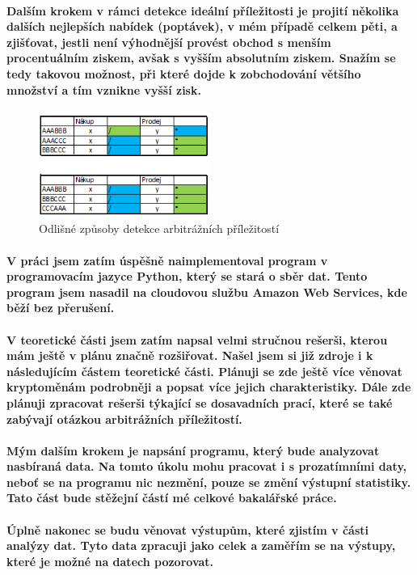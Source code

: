 \documentclass[thesis=B,czech]{FITthesis}[2019/03/21]
\begin{document}
\paragraph{
Dalším krokem v rámci detekce ideální příležitosti je projití několika dalších nejlepších nabídek (poptávek), v mém případě celkem pěti, a zjišťovat, jestli není výhodnější provést obchod s menším procentuálním ziskem, avšak s vyšším absolutním ziskem. Snažím se tedy takovou možnost, při které dojde k zobchodování většího množství a tím vznikne vyšší zisk.
}
\begin{figure}\centering
	\includegraphics[width=0.5\textwidth]{images/2_kombinace.PNG}
	\caption{Odlišné způsoby detekce arbitrážních příležitostí}\label{2_kombinace}
\end{figure}



\begin{conclusion}
\paragraph{
V práci jsem zatím úspěšně naimplementoval program v programovacím jazyce Python, který se stará o sběr dat. Tento program jsem nasadil na cloudovou službu Amazon Web Services, kde běží bez přerušení. 
}
\paragraph{
V teoretické části jsem zatím napsal velmi stručnou rešerši, kterou mám ještě v plánu značně rozšiřovat. Našel jsem si již zdroje i k následujícím částem teoretické části.  Plánuji se zde ještě více věnovat kryptoměnám podrobněji a popsat více jejich charakteristiky. Dále zde plánuji zpracovat rešerši týkající se dosavadních prací, které se také zabývají otázkou arbitrážních příležitostí.
}
\paragraph{
Mým dalším krokem je napsání programu, který bude analyzovat nasbíraná data. Na tomto úkolu mohu pracovat i s prozatímními daty, neboť se na programu nic nezmění, pouze se změní výstupní statistiky. Tato část bude stěžejní částí mé celkové bakalářské práce.
}
\paragraph{
Úplně nakonec se budu věnovat výstupům, které zjistím v části analýzy dat. Tyto data zpracuji jako celek a zaměřím se na výstupy, které je možné na datech pozorovat.
}

\end{conclusion}
\end{document}
